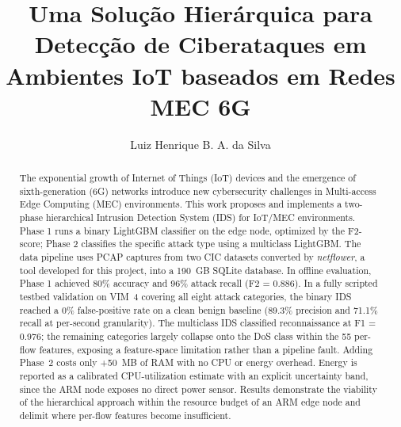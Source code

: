 \documentclass[12pt]{article}
\title{Uma  Solução Hierárquica para Detecção de Ciberataques em Ambientes IoT baseados em Redes MEC 6G }
\author{Luiz Henrique B. A. da Silva\inst{1}}
\begin{document}
\maketitle

\begin{abstract}
The exponential growth of Internet of Things (IoT) devices and the emergence
of sixth-generation (6G) networks introduce new cybersecurity challenges in
Multi-access Edge Computing (MEC) environments. This work proposes and
implements a two-phase hierarchical Intrusion Detection System (IDS) for
IoT/MEC environments. Phase 1 runs a binary LightGBM classifier on the edge
node, optimized by the F2-score; Phase 2 classifies the specific attack type
using a multiclass LightGBM. The data
pipeline uses PCAP captures from two CIC datasets converted by
\textit{netflower}, a tool developed for this project, into a 190~GB SQLite
database. In offline evaluation, Phase 1 achieved 80\% accuracy and 96\%
attack recall (F2 = 0.886). In a fully scripted testbed validation on VIM~4
covering all eight attack categories, the binary IDS reached a 0\%
false-positive rate on a clean benign baseline (89.3\% precision and 71.1\%
recall at per-second granularity). The multiclass IDS classified
reconnaissance at F1 = 0.976; the remaining categories largely collapse onto
the DoS class within the 55 per-flow features, exposing a feature-space
limitation rather than a pipeline fault. Adding Phase~2 costs only +50~MB of
RAM with no CPU or energy overhead. Energy is reported as a calibrated
CPU-utilization estimate with an explicit uncertainty band, since the ARM node
exposes no direct power sensor. Results demonstrate the viability of the
hierarchical approach within the resource budget of an ARM edge node and
delimit where per-flow features become insufficient.
\end{abstract}
\end{document}
